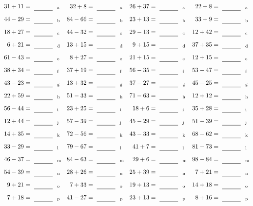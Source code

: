 \documentclass
[
  draft    = true,
  fontsize = 11pt,
  parskip  = half-
]
{scrartcl}
\begin{document}
\clearpage
\begin{align*}
    \pline{31+11}&=\rline{a}
  & \pline{32+8}&=\rline{a}
  & \pline{26+37}&=\rline{a}
  & \pline{22+8}&=\rline{a} \\[1ex]
    \pline{44-29}&=\rline{b}
  & \pline{84-66}&=\rline{b}
  & \pline{23+13}&=\rline{b}
  & \pline{33+9}&=\rline{b} \\[1ex]
    \pline{18+27}&=\rline{c}
  & \pline{44-32}&=\rline{c}
  & \pline{29-13}&=\rline{c}
  & \pline{12+42}&=\rline{c} \\[1ex]
    \pline{6+21}&=\rline{d}
  & \pline{13+15}&=\rline{d}
  & \pline{9+15}&=\rline{d}
  & \pline{37+35}&=\rline{d} \\[1ex]
    \pline{61-43}&=\rline{e}
  & \pline{8+27}&=\rline{e}
  & \pline{21+15}&=\rline{e}
  & \pline{12+15}&=\rline{e} \\[1ex]
    \pline{38+34}&=\rline{f}
  & \pline{37+19}&=\rline{f}
  & \pline{56-35}&=\rline{f}
  & \pline{53-47}&=\rline{f} \\[1ex]
    \pline{43-23}&=\rline{g}
  & \pline{13+32}&=\rline{g}
  & \pline{37-27}&=\rline{g}
  & \pline{45-25}&=\rline{g} \\[1ex]
    \pline{22+59}&=\rline{h}
  & \pline{51-33}&=\rline{h}
  & \pline{71-63}&=\rline{h}
  & \pline{12+12}&=\rline{h} \\[1ex]
    \pline{56-44}&=\rline{i}
  & \pline{23+25}&=\rline{i}
  & \pline{18+6}&=\rline{i}
  & \pline{35+28}&=\rline{i} \\[1ex]
    \pline{12+44}&=\rline{j}
  & \pline{57-39}&=\rline{j}
  & \pline{45-29}&=\rline{j}
  & \pline{51-39}&=\rline{j} \\[1ex]
    \pline{14+35}&=\rline{k}
  & \pline{72-56}&=\rline{k}
  & \pline{43-33}&=\rline{k}
  & \pline{68-62}&=\rline{k} \\[1ex]
    \pline{33-29}&=\rline{l}
  & \pline{79-67}&=\rline{l}
  & \pline{41+7}&=\rline{l}
  & \pline{81-73}&=\rline{l} \\[1ex]
    \pline{46-37}&=\rline{m}
  & \pline{84-63}&=\rline{m}
  & \pline{29+6}&=\rline{m}
  & \pline{98-84}&=\rline{m} \\[1ex]
    \pline{54-39}&=\rline{n}
  & \pline{28+26}&=\rline{n}
  & \pline{25+39}&=\rline{n}
  & \pline{7+21}&=\rline{n} \\[1ex]
    \pline{9+21}&=\rline{o}
  & \pline{7+33}&=\rline{o}
  & \pline{19+13}&=\rline{o}
  & \pline{14+18}&=\rline{o} \\[1ex]
    \pline{7+18}&=\rline{p}
  & \pline{41-27}&=\rline{p}
  & \pline{23+13}&=\rline{p}
  & \pline{8+16}&=\rline{p}
\end{align*}
\end{document}
